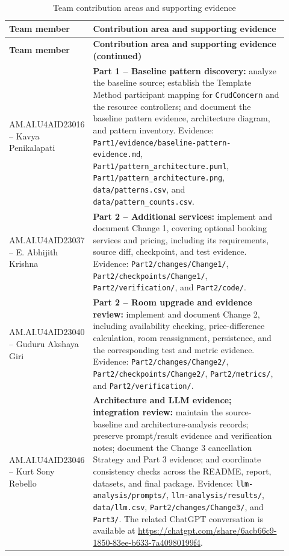 \documentclass[10pt,a4paper]{article}
\newcommand{\code}[1]{\texttt{\small #1}}
\begin{document}
\begin{longtable}{p{0.22\linewidth}p{0.70\linewidth}}
\caption{Team contribution areas and supporting evidence}\label{tab:team-contributions}\\
\toprule
\textbf{Team member} & \textbf{Contribution area and supporting evidence}\\
\midrule
\endfirsthead
\toprule
\textbf{Team member} & \textbf{Contribution area and supporting evidence (continued)}\\
\midrule
\endhead
AM.AI.U4AID23016 -- Kavya Penikalapati & \textbf{Part 1 -- Baseline pattern discovery:} analyze the baseline source; establish the Template Method participant mapping for \code{CrudConcern} and the resource controllers; and document the baseline pattern evidence, architecture diagram, and pattern inventory. Evidence: \code{Part1/evidence/baseline-pattern-evidence.md}, \code{Part1/pattern\_architecture.puml}, \code{Part1/pattern\_architecture.png}, \code{data/patterns.csv}, and \code{data/pattern\_counts.csv}.\\
\addlinespace
AM.AI.U4AID23037 -- E. Abhijith Krishna & \textbf{Part 2 -- Additional services:} implement and document Change 1, covering optional booking services and pricing, including its requirements, source diff, checkpoint, and test evidence. Evidence: \code{Part2/changes/Change1/}, \code{Part2/checkpoints/Change1/}, \code{Part2/verification/}, and \code{Part2/code/}.\\
\addlinespace
AM.AI.U4AID23040 -- Guduru Akshaya Giri & \textbf{Part 2 -- Room upgrade and evidence review:} implement and document Change 2, including availability checking, price-difference calculation, room reassignment, persistence, and the corresponding test and metric evidence. Evidence: \code{Part2/changes/Change2/}, \code{Part2/checkpoints/Change2/}, \code{Part2/metrics/}, and \code{Part2/verification/}.\\
\addlinespace
AM.AI.U4AID23046 -- Kurt Sony Rebello & \textbf{Architecture and LLM evidence; integration review:} maintain the source-baseline and architecture-analysis records; preserve prompt/result evidence and verification notes; document the Change 3 cancellation Strategy and Part 3 evidence; and coordinate consistency checks across the README, report, datasets, and final package. Evidence: \code{llm-analysis/prompts/}, \code{llm-analysis/results/}, \code{data/llm.csv}, \code{Part2/changes/Change3/}, and \code{Part3/}. The related ChatGPT conversation is available at \url{https://chatgpt.com/share/6acb66c9-1850-83ee-b633-7a40980199f4}.\\
\bottomrule
\end{longtable}
\end{document}
